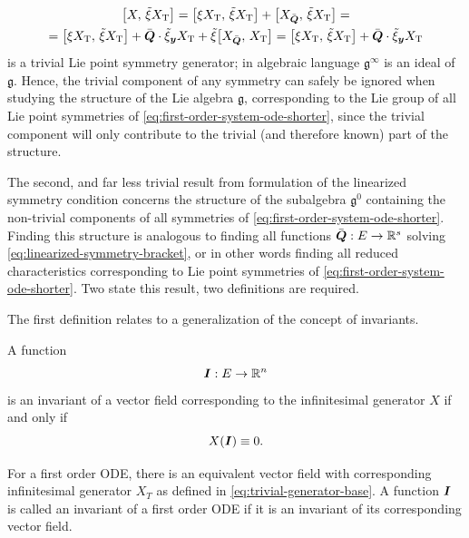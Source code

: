 \begin{multline*}
  \comm{X}{\tilde{\xi} X_{\text{T}}} =
  \comm{\xi X_{\text{T}}}{\tilde{\xi} X_{\text{T}}} + \comm{X_{\bar{\vect{Q}}}}{\tilde{\xi} X_{\text{T}}} =\\
  = \comm{\xi X_{\text{T}}}{\tilde{\xi} X_{\text{T}}} + \bar{\vect{Q}} \cdot \tilde{\xi}_{\vect{y}} X_{\text{T}} + \tilde{\xi} \comm{X_{\bar{\vect{Q}}}}{X_{\text{T}}} =
  \comm{\xi X_{\text{T}}}{\tilde{\xi} X_{\text{T}}} + \bar{\vect{Q}} \cdot \tilde{\xi}_{\vect{y}} X_{\text{T}}
\end{multline*}
is a trivial Lie point symmetry generator; in algebraic language \(\mathfrak{g}^\infty\) is an ideal of \(\mathfrak{g}\).
Hence, the trivial component of any symmetry can safely be ignored when studying the structure of the Lie algebra \(\mathfrak{g}\), corresponding to the Lie group of all Lie point symmetries of \cref{eq:first-order-system-ode-shorter}, since the trivial component will only contribute to the trivial (and therefore known) part of the structure.

The second, and far less trivial result from formulation  of the linearized symmetry condition concerns the structure of the subalgebra \(\mathfrak{g}^0\) containing the non-trivial components of all symmetries of \cref{eq:first-order-system-ode-shorter}.
Finding this structure is analogous to finding all functions \(\bar{\boldsymbol{Q}}: E \to \mathbb{R}^s\) solving \cref{eq:linearized-symmetry-bracket}, or in other words finding all reduced characteristics corresponding to Lie point symmetries of \cref{eq:first-order-system-ode-shorter}.
Two state this result, two definitions are required.

The first definition relates to a generalization of the concept of invariants.
\begin{defn}
  A function
  \begin{equation*}
    \boldsymbol{I}: E \to \mathbb{R}^n
  \end{equation*}
  is an invariant of a vector field corresponding to the infinitesimal generator \(X\) if and only if
  \begin{equation*}
    X(\boldsymbol{I}) \equiv 0.
  \end{equation*}
\end{defn}
For a first order ODE, there is an equivalent vector field with corresponding infinitesimal generator \(X_T\) as defined in \cref{eq:trivial-generator-base}.
A function \(\boldsymbol{I}\) is called an invariant of a first order ODE if it is an invariant of its corresponding vector field.


